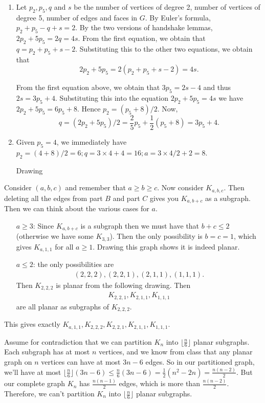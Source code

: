 \begin{enumerate}
   
    \begin{enumerate}
        \item Let $p_2, p_5, q$ and $s$ be the number of vertices of degree 2, number of vertices of degree 5, number of edges and faces in $G$. By Euler's formula, $p_2 + p_5 - q + s = 2$. By the two versions of handshake lemmas, $2p_2 + 5p_5 = 2q = 4s$. From the first equation, we obtain that $q = p_2 + p_5 + s - 2$. Substituting this to the other two equations, we obtain that
        \[2p_2 + 5p_5 = 2(p_2 + p_5 + s - 2) = 4s.\]

        From the first equation above, we obtain that $3p_5 = 2s -4$ and thus $2s = 3p_5 + 4$. Substituting this into the equation $2p_2 + 5p_5 = 4s$ we have $2p_2 + 5p_5 = 6p_5 + 8$. Hence $p_2 = (p_5 + 8)/2.$ Now, \[
        q = (2p_2 + 5p_5)/2 = \frac25 p_5 + \frac12 (p_5 + 8) = 3p_5 + 4.
        \]

        \item Given $p_5 = 4$, we immediately have $p_2 = (4+8)/2 = 6; q = 3\times 4 + 4 = 16; a = 3\times 4 /2 + 2 = 8$.
        
        Drawing
    \end{enumerate}

  
     Consider $(a,b,c)$ and remember that $a \geq b \geq c$. Now consider $K_{a,b,c}$. Then deleting all the edges from part $B$ and part $C$ gives you $K_{a,b+c}$ as a subgraph. Then we can think about the various cases for $a$.
    \begin{enumerate}
        \item[$a \geq 3$:] Since $K_{a,b+c}$ is a subgraph then we must have that $b+c \leq 2$ (otherwise we have some $K_{3,3}$). Then the only possibility is $b=c=1$, which gives $K_{a,1,1}$ for all $a \geq 1$. Drawing this graph shows it is indeed planar.
        \item[$a \leq 2$:] the only possibilities are
        \begin{align*}
            (2,2,2), (2,2,1) , (2,1,1), (1,1,1).
        \end{align*}
        Then $K_{2,2,2}$ is planar from the following drawing. Then
        \begin{align*}
            K_{2,2,1}, K_{2,1,1},K_{1,1,1}
        \end{align*}
        are all planar as subgraphs of $K_{2,2,2}$.
    \end{enumerate}
    This gives exactly $K_{a,1,1}, K_{2,2,2}, K_{2,2,1}, K_{2,1,1},K_{1,1,1}$.

     Assume for contradiction that we can partition $K_n$ into $\lfloor \frac{n}{6} \rfloor$ planar subgraphs. Each subgraph has at most $n$ vertices, and we know from class that any planar graph on $n$ vertices can have at most $3n - 6$ edges. So in our partitioned graph, we'll have at most $\lfloor \frac{n}{6} \rfloor (3n - 6) \le \frac{n}{6} (3n - 6) = \frac{1}{2} (n^2 - 2n) = \frac{n(n-2)}{2}$. But our complete graph $K_n$ has $\frac{n(n-1)}{2}$ edges, which is more than $\frac{n(n-2)}{2}$. Therefore, we can't partition $K_n$ into  $\lfloor \frac{n}{6} \rfloor$ planar subgraphs.
\end{enumerate}